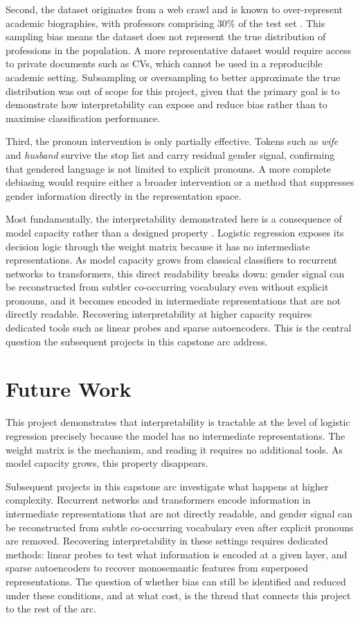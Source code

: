 \documentclass[11pt, a4paper]{article}
\begin{document}
Second, the dataset originates from a web crawl and is known to 
over-represent academic biographies, with professors comprising 30\% of the 
test set \citep{de2019bias}. This sampling bias means the dataset does not 
represent the true distribution of professions in the population. A more 
representative dataset would require access to private documents such as 
CVs, which cannot be used in a reproducible academic setting. Subsampling 
or oversampling to better approximate the true distribution was out of scope 
for this project, given that the primary goal is to demonstrate how 
interpretability can expose and reduce bias rather than to maximise 
classification performance.

Third, the pronoun intervention is only partially effective. Tokens such as 
\textit{wife} and \textit{husband} survive the stop list and carry residual 
gender signal, confirming that gendered language is not limited to explicit 
pronouns. A more complete debiasing would require either a broader 
intervention or a method that suppresses gender information directly in the 
representation space.

Most fundamentally, the interpretability demonstrated here is a consequence 
of model capacity rather than a designed property \citep{alain2016understanding}. 
Logistic regression exposes its decision logic through the weight matrix 
because it has no intermediate representations. As model capacity grows 
from classical classifiers to recurrent networks to transformers, this 
direct readability breaks down: gender signal can be reconstructed from 
subtler co-occurring vocabulary even without explicit pronouns, and it 
becomes encoded in intermediate representations that are not directly 
readable. Recovering interpretability at higher capacity requires dedicated 
tools such as linear probes and sparse autoencoders. This is the central 
question the subsequent projects in this capstone arc address.

\section{Future Work}

This project demonstrates that interpretability is tractable at the level 
of logistic regression precisely because the model has no intermediate 
representations. The weight matrix is the mechanism, and reading it 
requires no additional tools. As model capacity grows, this property 
disappears.

Subsequent projects in this capstone arc investigate what happens at higher 
complexity. Recurrent networks and transformers encode information in 
intermediate representations that are not directly readable, and gender 
signal can be reconstructed from subtle co-occurring vocabulary even after 
explicit pronouns are removed. Recovering interpretability in these settings 
requires dedicated methods: linear probes \citep{alain2016understanding} to 
test what information is encoded at a given layer, and sparse autoencoders 
to recover monosemantic features from superposed representations. The 
question of whether bias can still be identified and reduced under these 
conditions, and at what cost, is the thread that connects this project to 
the rest of the arc.



\end{document}
